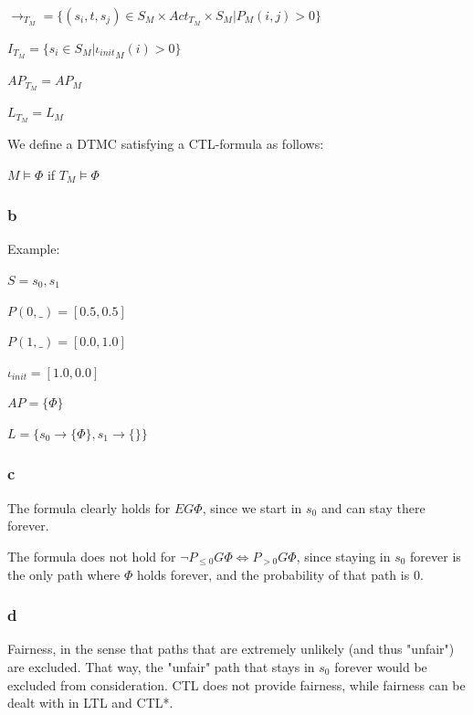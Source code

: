 $\to_{T_M} = \{(s_i, t, s_j) \in S_M \times Act_{T_M} \times S_M | P_M(i, j) > 0\}$

$I_{T_M} = \{s_i \in S_M | {\iota_{init}}_M(i) > 0\}$

$AP_{T_M} = AP_M$

$L_{T_M} = L_M$

We define a DTMC satisfying a CTL-formula as follows:

$M \models \Phi$ if $T_M \models \Phi$

\subsubsection{b}

Example:

$S = {s_0, s_1}$

$P(0, \_) = [0.5, 0.5]$

$P(1, \_) = [0.0, 1.0]$

$\iota_{init} = [1.0, 0.0]$

$AP = \{\Phi\}$

$L = \{s_0 \to \{\Phi\}, s_1 \to \{\}\}$

\subsubsection{c}

The formula clearly holds for $EG \Phi$,
since we start in $s_0$ and can stay there
forever.

The formula does not hold for $\neg P_{\leq 0} G \Phi \Leftrightarrow P_{>0} G \Phi$,
since staying in $s_0$ forever is the only
path where $\Phi$ holds forever,
and the probability of that path is 0.

\subsubsection{d}

Fairness, in the sense that paths that are extremely unlikely (and thus "unfair")
are excluded.
That way, the "unfair" path that stays in $s_0$ forever would be excluded from consideration.
CTL does not provide fairness, while fairness can be dealt with in LTL and CTL*.

